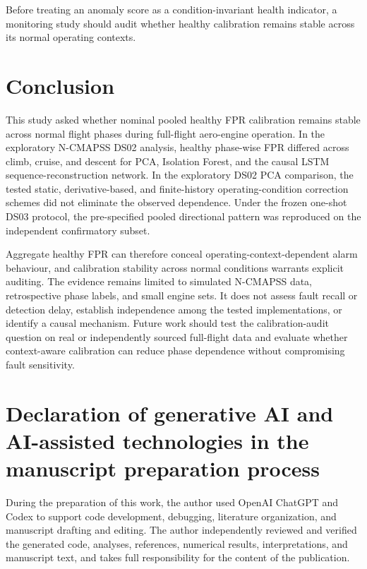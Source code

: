 \documentclass[preprint,12pt]{elsarticle}
\begin{document}
Before treating an anomaly score as a condition-invariant health indicator, a monitoring study should audit whether healthy calibration remains stable across its normal operating contexts.

\section{Conclusion}\label{conclusion}

This study asked whether nominal pooled healthy FPR calibration remains stable across normal flight phases during full-flight aero-engine operation. In the exploratory N-CMAPSS DS02 analysis, healthy phase-wise FPR differed across climb, cruise, and descent for PCA, Isolation Forest, and the causal LSTM sequence-reconstruction network. In the exploratory DS02 PCA comparison, the tested static, derivative-based, and finite-history operating-condition correction schemes did not eliminate the observed dependence. Under the frozen one-shot DS03 protocol, the pre-specified pooled directional pattern was reproduced on the independent confirmatory subset.

Aggregate healthy FPR can therefore conceal operating-context-dependent alarm behaviour, and calibration stability across normal conditions warrants explicit auditing. The evidence remains limited to simulated N-CMAPSS data, retrospective phase labels, and small engine sets. It does not assess fault recall or detection delay, establish independence among the tested implementations, or identify a causal mechanism. Future work should test the calibration-audit question on real or independently sourced full-flight data and evaluate whether context-aware calibration can reduce phase dependence without compromising fault sensitivity.

\section*{Declaration of generative AI and AI-assisted technologies in the manuscript preparation process}
During the preparation of this work, the author used OpenAI ChatGPT and Codex to support code development, debugging, literature organization, and manuscript drafting and editing. The author independently reviewed and verified the generated code, analyses, references, numerical results, interpretations, and manuscript text, and takes full responsibility for the content of the publication.
\end{document}
